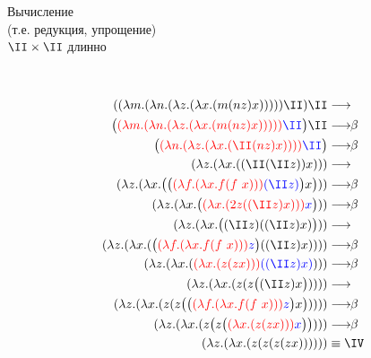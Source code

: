 \begin{frame}[plain]{Вычисление \\(т.е. редукция, упрощение) \\$\II\times\II$ длинно}
\def\betaarr{\longrightarrow\!\!\beta}
\def\numTWO{\ensuremath{\lam{f}{\lam{x}{f(f\ x)}}}}
\setcounter{equation}{0}
\begin{figure}[t]
  \begin{subfigure}[t]{0.35\textwidth}
  $\qquad$
  \end{subfigure}
  \begin{subfigure}[t]{0.55\textwidth}
        \vspace{-8em}

        {  \begin{align}
          \apppl{\app{\lam{m}{\lam{n}{\lam{z}{\lam{x}{(m \app{n}{z} x)}}}}}{\II}}{\II} & \longrightarrow \\
          \Apppl{\Redex{\lam{m}{\lam{n}{\lam{z}{\lam{x}{(m \app{n}{z} x)}}}}}{\II}}{\II} & \betaarr \\
          \Redex{\lam{n}{\lam{z}{\lam{x}{(\II \app{n}{z} x)}}}}{\II} & \betaarr \\
          \lam{z}{\lam{x}{\app{\app{\II}{\app{\II}{z}}}{x}}} & \longrightarrow \\
          \lam{z}{\lam{x}{\App{\Redex{\numTWO}{\app{\II}{z}}}{x}}} & \betaarr \\
          \lam{z}{\lam{x}{\Redex{\lam{x}{(2 z (\app{\II}{z} x))}}{x}}} & \betaarr \\
          \lam{z}{\lam{x}{\App{\app{\II}{z}}{(\app{\II}{z} x)}}} & \longrightarrow \\
          \lam{z}{\lam{x}{\app{\Redex{\numTWO}{z}}{(\app{\II}{z} x)}}} & \betaarr \\
          \lam{z}{\lam{x}{\redex{\lam{x}{\app{z}{\app{z}{x}}}}{(\app{\II}{z} x)}}} & \betaarr \\
          \lam{z}{\lam{x}{\app{z}{\app{z}{\App{\app{\II}{z}}{x}}}}} & \longrightarrow \\
          \lam{z}{\lam{x}{\app{z}{\app{z}{\App{\Redex{\numTWO}{z}}{x}}}}} & \betaarr \\
          \lam{z}{\lam{x}{\app{z}{\App{z}{\Redex{\lam{x}{\app{z}{\app{z}{x}}}}{x}}}}} & \betaarr \\
          \lam{z}{\lam{x}{\app{z}{\app{z}{\app{z}{\app{z}{x}}}}}} & \equiv \IV
        \end{align}}
  \end{subfigure}
\end{figure}

\end{frame}

